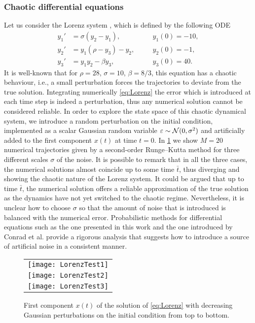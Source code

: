 \documentclass[10pt]{article}
\begin{document}
\subsubsection*{Chaotic differential equations} Let us consider the Lorenz system \cite{Lor63}, which is defined by the following ODE
\begin{equation}\label{eq:Lorenz}
\begin{aligned}
	y_1' &= \sigma(y_2 - y_1), \quad &&y_1(0) = -10,\\
	y_2' &= y_1(\rho - y_3) - y_2, \quad &&y_2(0) = -1,\\
	y_3' &= y_1y_2 - \beta y_3, \quad &&y_3(0) = 40.
\end{aligned}
\end{equation}
It is well-known that for $\rho=28$, $\sigma=10$, $\beta=8/3$, this equation has a chaotic behaviour, i.e., a small perturbation forces the trajectories to deviate from the true solution. Integrating numerically \eqref{eq:Lorenz} the error which is introduced at each time step is indeed a perturbation, thus any numerical solution cannot be considered reliable. In order to explore the state space of this chaotic dynamical system, we introduce a random perturbation on the initial condition, implemented as a scalar Gaussian random variable $\varepsilon \sim \mathcal{N}(0, \sigma^2)$ and artificially added to the first component $x(t)$ at time $t = 0$. In \cref{fig:LorenzTest} we show $M = 20$ numerical trajectories given by a second-order Runge--Kutta method for three different scales $\sigma$ of the noise. It is possible to remark that in all the three cases, the numerical solutions almost coincide up to some time $\bar t$, thus diverging and showing the chaotic nature of the Lorenz system. It could be argued that up to time $\bar t$, the numerical solution offers a reliable approximation of the true solution as the dynamics have not yet switched to the chaotic regime. Nevertheless, it is unclear how to choose $\sigma$ so that the amount of noise that is introduced is balanced with the numerical error. Probabilistic methods for differential equations such as the one presented in this work and the one introduced by Conrad et al. \cite{CGS16} provide a rigorous analysis that suggests how to introduce a source of artificial noise in a consistent manner.
 
\begin{figure}
	\begin{center}
		\begin{tabular}{c}
			\texttt{[image: LorenzTest1]} \\
			\texttt{[image: LorenzTest2]} \\
			\texttt{[image: LorenzTest3]}
		\end{tabular}
	\end{center}
	\caption{First component $x(t)$ of the solution of \eqref{eq:Lorenz} with decreasing Gaussian perturbations on the initial condition from top to bottom.}
	\label{fig:LorenzTest}
\end{figure}
\end{document}
